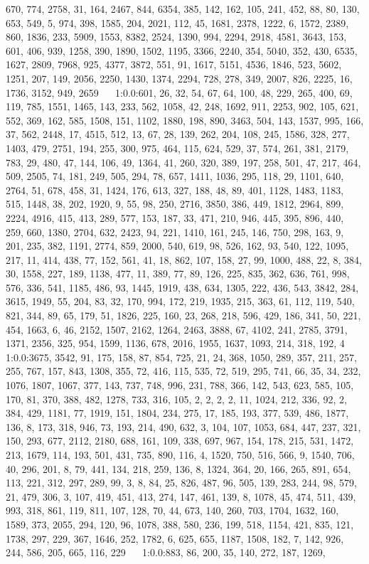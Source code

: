 \documentclass[a4paper,11pt,oneside]{book}
\begin{document}
670, 774, 2758, 31, 164, 2467, 844, 6354, 385, 142, 162, 105, 241, 452, 88, 80, 130, 653, 549, 5, 974, 398, 1585, 204, 2021, 112, 45, 1681, 2378, 1222, 6, 1572, 2389, 860, 1836, 233, 5909, 1553, 8382, 2524, 1390, 994, 2294, 2918, 4581, 3643, 153, 601, 406, 939, 1258, 390, 1890, 1502, 1195, 3366, 2240, 354, 5040, 352, 430, 6535, 1627, 2809, 7968, 925, 4377, 3872, 551, 91, 1617, 5151, 4536, 1846, 523, 5602, 1251, 207, 149, 2056, 2250, 1430, 1374, 2294, 728, 278, 349, 2007, 826, 2225, 16, 1736, 3152, 949, 2659	$\quad$	1:0.0:601, 26, 32, 54, 67, 64, 100, 48, 229, 265, 400, 69, 119, 785, 1551, 1465, 143, 233, 562, 1058, 42, 248, 1692, 911, 2253, 902, 105, 621, 552, 369, 162, 585, 1508, 151, 1102, 1880, 198, 890, 3463, 504, 143, 1537, 995, 166, 37, 562, 2448, 17, 4515, 512, 13, 67, 28, 139, 262, 204, 108, 245, 1586, 328, 277, 1403, 479, 2751, 194, 255, 300, 975, 464, 115, 624, 529, 37, 574, 261, 381, 2179, 783, 29, 480, 47, 144, 106, 49, 1364, 41, 260, 320, 389, 197, 258, 501, 47, 217, 464, 509, 2505, 74, 181, 249, 505, 294, 78, 657, 1411, 1036, 295, 118, 29, 1101, 640, 2764, 51, 678, 458, 31, 1424, 176, 613, 327, 188, 48, 89, 401, 1128, 1483, 1183, 515, 1448, 38, 202, 1920, 9, 55, 98, 250, 2716, 3850, 386, 449, 1812, 2964, 899, 2224, 4916, 415, 413, 289, 577, 153, 187, 33, 471, 210, 946, 445, 395, 896, 440, 259, 660, 1380, 2704, 632, 2423, 94, 221, 1410, 161, 245, 146, 750, 298, 163, 9, 201, 235, 382, 1191, 2774, 859, 2000, 540, 619, 98, 526, 162, 93, 540, 122, 1095, 217, 11, 414, 438, 77, 152, 561, 41, 18, 862, 107, 158, 27, 99, 1000, 488, 22, 8, 384, 30, 1558, 227, 189, 1138, 477, 11, 389, 77, 89, 126, 225, 835, 362, 636, 761, 998, 576, 336, 541, 1185, 486, 93, 1445, 1919, 438, 634, 1305, 222, 436, 543, 3842, 284, 3615, 1949, 55, 204, 83, 32, 170, 994, 172, 219, 1935, 215, 363, 61, 112, 119, 540, 821, 344, 89, 65, 179, 51, 1826, 225, 160, 23, 268, 218, 596, 429, 186, 341, 50, 221, 454, 1663, 6, 46, 2152, 1507, 2162, 1264, 2463, 3888, 67, 4102, 241, 2785, 3791, 1371, 2356, 325, 954, 1599, 1136, 678, 2016, 1955, 1637, 1093, 214, 318, 192, 4	$\quad$	1:0.0:3675, 3542, 91, 175, 158, 87, 854, 725, 21, 24, 368, 1050, 289, 357, 211, 257, 255, 767, 157, 843, 1308, 355, 72, 416, 115, 535, 72, 519, 295, 741, 66, 35, 34, 232, 1076, 1807, 1067, 377, 143, 737, 748, 996, 231, 788, 366, 142, 543, 623, 585, 105, 170, 81, 370, 388, 482, 1278, 733, 316, 105, 2, 2, 2, 2, 11, 1024, 212, 336, 92, 2, 384, 429, 1181, 77, 1919, 151, 1804, 234, 275, 17, 185, 193, 377, 539, 486, 1877, 136, 8, 173, 318, 946, 73, 193, 214, 490, 632, 3, 104, 107, 1053, 684, 447, 237, 321, 150, 293, 677, 2112, 2180, 688, 161, 109, 338, 697, 967, 154, 178, 215, 531, 1472, 213, 1679, 114, 193, 501, 431, 735, 890, 116, 4, 1520, 750, 516, 566, 9, 1540, 706, 40, 296, 201, 8, 79, 441, 134, 218, 259, 136, 8, 1324, 364, 20, 166, 265, 891, 654, 113, 221, 312, 297, 289, 99, 3, 8, 84, 25, 826, 487, 96, 505, 139, 283, 244, 98, 579, 21, 479, 306, 3, 107, 419, 451, 413, 274, 147, 461, 139, 8, 1078, 45, 474, 511, 439, 993, 318, 861, 119, 811, 107, 128, 70, 44, 673, 140, 260, 703, 1704, 1632, 160, 1589, 373, 2055, 294, 120, 96, 1078, 388, 580, 236, 199, 518, 1154, 421, 835, 121, 1738, 297, 229, 367, 1646, 252, 1782, 6, 625, 655, 1187, 1508, 182, 7, 142, 926, 244, 586, 205, 665, 116, 229	$\quad$	1:0.0:883, 86, 200, 35, 140, 272, 187, 1269, 
\end{document}
